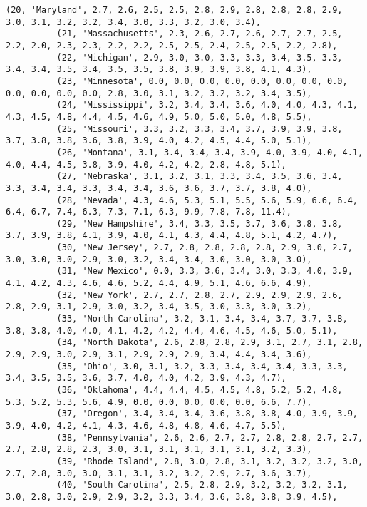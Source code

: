 \documentclass[11pt]{article}
\begin{document}
\begin{Verbatim}[commandchars=\\\{\}]
          (20, 'Maryland', 2.7, 2.6, 2.5, 2.5, 2.8, 2.9, 2.8, 2.8, 2.8, 2.9, 3.0, 3.1, 3.2, 3.2, 3.4, 3.0, 3.3, 3.2, 3.0, 3.4),
          (21, 'Massachusetts', 2.3, 2.6, 2.7, 2.6, 2.7, 2.7, 2.5, 2.2, 2.0, 2.3, 2.3, 2.2, 2.2, 2.5, 2.5, 2.4, 2.5, 2.5, 2.2, 2.8),
          (22, 'Michigan', 2.9, 3.0, 3.0, 3.3, 3.3, 3.4, 3.5, 3.3, 3.4, 3.4, 3.5, 3.4, 3.5, 3.5, 3.8, 3.9, 3.9, 3.8, 4.1, 4.3),
          (23, 'Minnesota', 0.0, 0.0, 0.0, 0.0, 0.0, 0.0, 0.0, 0.0, 0.0, 0.0, 0.0, 0.0, 2.8, 3.0, 3.1, 3.2, 3.2, 3.2, 3.4, 3.5),
          (24, 'Mississippi', 3.2, 3.4, 3.4, 3.6, 4.0, 4.0, 4.3, 4.1, 4.3, 4.5, 4.8, 4.4, 4.5, 4.6, 4.9, 5.0, 5.0, 5.0, 4.8, 5.5),
          (25, 'Missouri', 3.3, 3.2, 3.3, 3.4, 3.7, 3.9, 3.9, 3.8, 3.7, 3.8, 3.8, 3.6, 3.8, 3.9, 4.0, 4.2, 4.5, 4.4, 5.0, 5.1),
          (26, 'Montana', 3.1, 3.4, 3.4, 3.4, 3.9, 4.0, 3.9, 4.0, 4.1, 4.0, 4.4, 4.5, 3.8, 3.9, 4.0, 4.2, 4.2, 2.8, 4.8, 5.1),
          (27, 'Nebraska', 3.1, 3.2, 3.1, 3.3, 3.4, 3.5, 3.6, 3.4, 3.3, 3.4, 3.4, 3.3, 3.4, 3.4, 3.6, 3.6, 3.7, 3.7, 3.8, 4.0),
          (28, 'Nevada', 4.3, 4.6, 5.3, 5.1, 5.5, 5.6, 5.9, 6.6, 6.4, 6.4, 6.7, 7.4, 6.3, 7.3, 7.1, 6.3, 9.9, 7.8, 7.8, 11.4),
          (29, 'New Hampshire', 3.4, 3.3, 3.5, 3.7, 3.6, 3.8, 3.8, 3.7, 3.9, 3.8, 4.1, 3.9, 4.0, 4.1, 4.3, 4.4, 4.8, 5.1, 4.2, 4.7),
          (30, 'New Jersey', 2.7, 2.8, 2.8, 2.8, 2.8, 2.9, 3.0, 2.7, 3.0, 3.0, 3.0, 2.9, 3.0, 3.2, 3.4, 3.4, 3.0, 3.0, 3.0, 3.0),
          (31, 'New Mexico', 0.0, 3.3, 3.6, 3.4, 3.0, 3.3, 4.0, 3.9, 4.1, 4.2, 4.3, 4.6, 4.6, 5.2, 4.4, 4.9, 5.1, 4.6, 6.6, 4.9),
          (32, 'New York', 2.7, 2.7, 2.8, 2.7, 2.9, 2.9, 2.9, 2.6, 2.8, 2.9, 3.1, 2.9, 3.0, 3.2, 3.4, 3.5, 3.0, 3.3, 3.0, 3.2),
          (33, 'North Carolina', 3.2, 3.1, 3.4, 3.4, 3.7, 3.7, 3.8, 3.8, 3.8, 4.0, 4.0, 4.1, 4.2, 4.2, 4.4, 4.6, 4.5, 4.6, 5.0, 5.1),
          (34, 'North Dakota', 2.6, 2.8, 2.8, 2.9, 3.1, 2.7, 3.1, 2.8, 2.9, 2.9, 3.0, 2.9, 3.1, 2.9, 2.9, 2.9, 3.4, 4.4, 3.4, 3.6),
          (35, 'Ohio', 3.0, 3.1, 3.2, 3.3, 3.4, 3.4, 3.4, 3.3, 3.3, 3.4, 3.5, 3.5, 3.6, 3.7, 4.0, 4.0, 4.2, 3.9, 4.3, 4.7),
          (36, 'Oklahoma', 4.4, 4.4, 4.5, 4.5, 4.8, 5.2, 5.2, 4.8, 5.3, 5.2, 5.3, 5.6, 4.9, 0.0, 0.0, 0.0, 0.0, 0.0, 6.6, 7.7),
          (37, 'Oregon', 3.4, 3.4, 3.4, 3.6, 3.8, 3.8, 4.0, 3.9, 3.9, 3.9, 4.0, 4.2, 4.1, 4.3, 4.6, 4.8, 4.8, 4.6, 4.7, 5.5),
          (38, 'Pennsylvania', 2.6, 2.6, 2.7, 2.7, 2.8, 2.8, 2.7, 2.7, 2.7, 2.8, 2.8, 2.3, 3.0, 3.1, 3.1, 3.1, 3.1, 3.1, 3.2, 3.3),
          (39, 'Rhode Island', 2.8, 3.0, 2.8, 3.1, 3.2, 3.2, 3.2, 3.0, 2.7, 2.8, 3.0, 3.0, 3.1, 3.1, 3.2, 3.2, 2.9, 2.7, 3.6, 3.7),
          (40, 'South Carolina', 2.5, 2.8, 2.9, 3.2, 3.2, 3.2, 3.1, 3.0, 2.8, 3.0, 2.9, 2.9, 3.2, 3.3, 3.4, 3.6, 3.8, 3.8, 3.9, 4.5),

\end{Verbatim}
\end{document}
